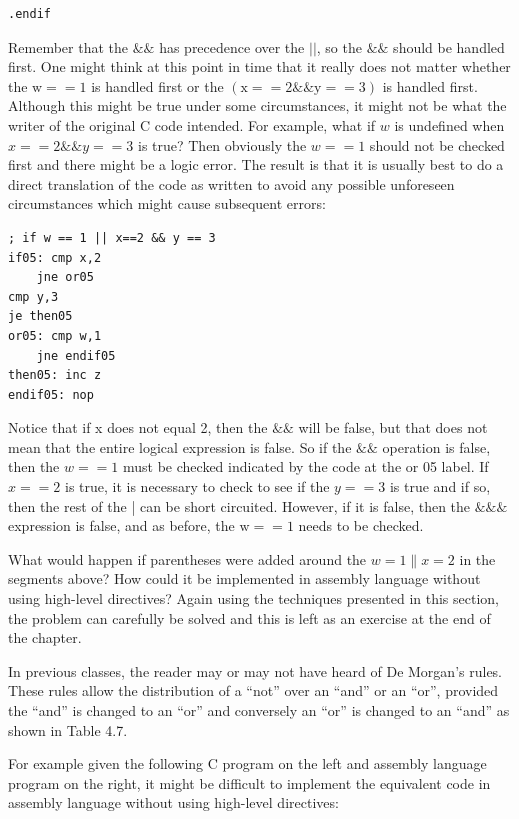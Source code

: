 \documentclass[10pt]{book}
\begin{document}
\begin{verbatim}
.endif
\end{verbatim}

Remember that the $\& \&$ has precedence over the $|\mid$, so the $\& \&$ should be handled first. One might think at this point in time that it really does not matter whether the $\mathrm{w}==1$ is handled first or the $(\mathrm{x}==2 \& \& \mathrm{y}==3)$ is handled first. Although this might be true under some circumstances, it might not be what the writer of the original C code intended. For example, what if $w$ is undefined when $x==2 \& \& y==3$ is true? Then obviously the $w==1$ should not be checked first and there might be a logic error. The result is that it is usually best to do a direct translation of the code as written to avoid any possible unforeseen circumstances which might cause subsequent errors:

\begin{verbatim}
; if w == 1 || x==2 && y == 3
if05: cmp x,2
    jne or05
cmp y,3
je then05
or05: cmp w,1
    jne endif05
then05: inc z
endif05: nop
\end{verbatim}

Notice that if x does not equal 2, then the $\& \&$ will be false, but that does not mean that the entire logical expression is false. So if the $\& \&$ operation is false, then the $w==1$ must be checked indicated by the code at the or 05 label. If $x==2$ is true, it is necessary to check to see if the $y==3$ is true and if so, then the rest of the | can be short circuited. However, if it is false, then the $\& \& \&$ expression is false, and as before, the $\mathrm{w}==1$ needs to be checked.

What would happen if parentheses were added around the $w=1 \| x=2$ in the segments above? How could it be implemented in assembly language without using high-level directives? Again using the techniques presented in this section, the problem can carefully be solved and this is left as an exercise at the end of the chapter.

In previous classes, the reader may or may not have heard of De Morgan's rules. These rules allow the distribution of a ``not'' over an ``and'' or an ``or'', provided the ``and'' is changed to an ``or'' and conversely an ``or'' is changed to an ``and'' as shown in Table 4.7.

For example given the following C program on the left and assembly language program on the right, it might be difficult to implement the equivalent code in assembly language without using high-level directives:
\end{document}
